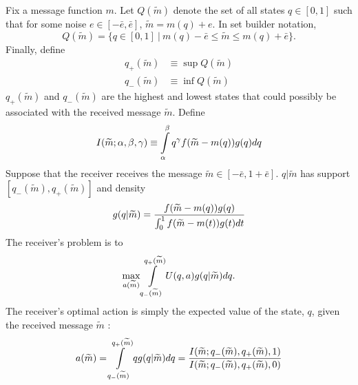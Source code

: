 \documentclass[12pt]{article}
\begin{document}
Fix a message function $m$. Let $Q(\widetilde{m})$ denote the set of all states $q\in [ 0,1]$ such that for some noise $e\in [ -\bar{e},\bar{e}]$, $\widetilde{m}=m(q)+e$. In set builder notation,
\begin{equation}
	Q(\widetilde{m})=\{q\in[0,1]\:|\:m(q)-\bar{e}\leq \widetilde{m}\leq m(q)+\bar{e}\}.
\end{equation}
Finally, define
\begin{align}
	q_{+}(\widetilde{m})&\equiv \sup Q(\widetilde{m})\\
	q_{-}(\widetilde{m})&\equiv \inf Q(\widetilde{m})
\end{align}
$q_{+}(\widetilde{m})$ and $ q_{-}(\widetilde{m})$ are the highest and lowest states that could possibly be associated with the received message $\widetilde{m}$. Define
\begin{equation}
	I(\widetilde{m};\alpha,\beta,\gamma)\equiv\int\displaylimits_{\alpha}^{\beta}{q^{\gamma}f(\widetilde{m}-m(q))g(q)dq}
\end{equation}
Suppose that the receiver receives the message $\widetilde{m}\in [ - \bar{e},1+\bar{e}]$. $q|\widetilde{m}$ has support $[q_{-}( \widetilde{m}),q_{+}(\widetilde{m})]$ and density
\begin{equation}\label{eq:posterior} 
	g(q|\widetilde{m})=\frac{f(\widetilde{m}-m(q))g(q)}{\int\displaylimits_{0}^{1}{ f(\widetilde{m}-m(t))g(t)dt}}  
\end{equation} 
The receiver's problem is to 
\begin{equation} 
	\max_{a(\widetilde{m})}\int\displaylimits_{q_{-}(\widetilde{m})}^{q_{+}(\widetilde{m})}{U(q,a)g(q|\widetilde{m})}dq.  
\end{equation} 
The receiver's optimal action is simply the expected value of the state, $q$, given the received message $\widetilde{m}$ : 
\begin{equation}
	a(\widetilde{m})=\int\displaylimits_{q_{-}(\widetilde{m})}^{q_{+}(\widetilde{m})}{qg(q| \widetilde{m})dq}=\frac{I(\widetilde{m};q_{-}(\widetilde{m}),q_{+}(\widetilde{m}),1)}{I(\widetilde{m};q_{-}(\widetilde{m}),q_{+}(\widetilde{m}),0)}\label{eq:optact} 
\end{equation}
\end{document}

